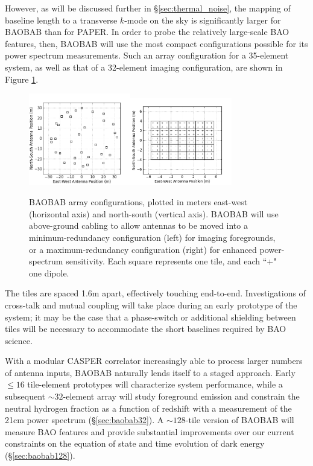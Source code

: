 \documentclass[10pt,iop]{emulateapj}
\begin{document}
However, as will be discussed further in \S\ref{sec:thermal_noise}, the mapping
of
baseline length to a transverse $k$-mode on the sky is significantly larger for
BAOBAB
than for PAPER.  In order to probe the relatively large-scale BAO features, 
then, BAOBAB will
use the most compact configurations possible for its power spectrum 
measurements.
Such an array configuration for a 35-element system, as well as that of a 
32-element 
imaging configuration, 
are shown in Figure \ref{fig:configuration}.  
\begin{figure}\centering
\includegraphics[width=1.75in]{antpos32min.png}\includegraphics[width=1.75in]{antpos32max.png}
\caption{BAOBAB array configurations, plotted in meters east-west 
(horizontal axis) and north-south (vertical axis).  BAOBAB will use above-ground
cabling to allow antennas to be moved into
a minimum-redundancy configuration (left) for imaging foregrounds, or
a maximum-redundancy configuration (right) for enhanced power-spectrum sensitivity.
Each square represents one tile, and each ``+" one dipole.
}
\label{fig:configuration}
\end{figure}
The tiles are spaced 1.6m apart, effectively touching 
end-to-end.  Investigations of cross-talk and mutual coupling will take place during an early
prototype of the system; it may be the case that a phase-switch or additional shielding between
tiles will be necessary to accommodate the short baselines required by BAO science.

With a modular CASPER correlator increasingly able to process larger numbers of antenna inputs, 
BAOBAB naturally lends itself to a staged approach.  Early $\leq 16$ tile-element prototypes 
will characterize system performance, while a subsequent
$\sim32$-element array will study foreground emission and 
constrain the neutral hydrogen fraction as a function of redshift 
with a measurement of the 21cm power
spectrum (\S\ref{sec:baobab32}).  A $\sim128$-tile version of BAOBAB 
will measure BAO features and provide substantial improvements over our current
constraints on the equation of state and time evolution of dark energy (\S\ref{sec:baobab128}). 
\end{document}
